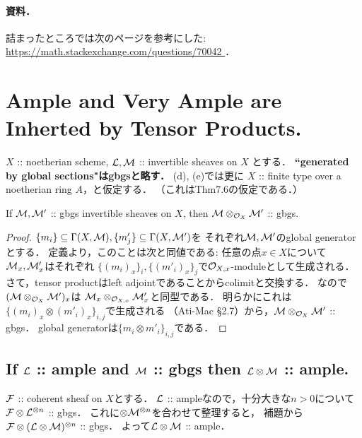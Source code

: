 \documentclass[a4paper]{jsarticle}
\begin{document}
    \paragraph{資料．}
    詰まったところでは次のページを参考にした:
    \url{ https://math.stackexchange.com/questions/70042 }．
          
\section{Ample and Very Ample are Inherted by Tensor Products.} %
    $X$ :: noetherian scheme,
    $\mathcal{L}, \mathcal{M}$ :: invertible sheaves on $X$
    とする．
    \textbf{``generated by global sections"はgbgsと略す．}
    (d), (e)では更に
    $X$ :: finite type over a noetherian ring $A$，と仮定する．
    （これはThm7.6の仮定である．）

    \begin{Lemma}
        If $\mathcal{M}, \mathcal{M}'$ :: gbgs invertible sheaves on $X$,
        then $\mathcal{M} \otimes_{\mathcal{O}_X} \mathcal{M}'$ :: gbgs.
    \end{Lemma}
    \begin{proof}
        $\{m_i\} \subseteq \Gamma(X, \mathcal{M}), \{m'_j\} \subseteq \Gamma(X, \mathcal{M}')$を
        それぞれ$\mathcal{M}, \mathcal{M}'$のglobal generatorとする．
        定義より，このことは次と同値である:
        任意の点$x \in X$について$\mathcal{M}_x, \mathcal{M}'_x$はそれぞれ
        $\{(m_i)_x\}_i, \{(m'_i)_x\}_j$で$\mathcal{O}_{X,x}$-moduleとして生成される．
        さて，tensor productはleft adjointであることからcolimitと交換する．
        なので$(\mathcal{M} \otimes_{\mathcal{O}_X} \mathcal{M}')_x$は
        $\mathcal{M}_x \otimes_{\mathcal{O}_{X,x}} \mathcal{M}'_x$と同型である．
        明らかにこれは$\{(m_i)_x \otimes (m'_i)_x\}_{i,j}$で生成される
        （Ati-Mac \S2.7）から，$\mathcal{M} \otimes_{\mathcal{O}_X} \mathcal{M}'$ :: gbgs．
        global generatorは$\{m_i \otimes m'_i\}_{i,j}$である．
    \end{proof}

    \subsection{If $\mathcal{L}$ :: ample and $\mathcal{M}$ :: gbgs then $\mathcal{L} \otimes \mathcal{M}$ :: ample.}
        $\mathcal{F}$ :: coherent sheaf on $X$とする．
        $\mathcal{L}$ :: ampleなので，十分大きな$n>0$について
        $\mathcal{F} \otimes \mathcal{L}^{\otimes n}$ :: gbgs．
        これに$\otimes \mathcal{M}^{\otimes n}$を合わせて整理すると，
        補題から$\mathcal{F} \otimes (\mathcal{L} \otimes \mathcal{M})^{\otimes n}$ :: gbgs．
        よって$\mathcal{L} \otimes \mathcal{M}$ :: ample．
\end{document}
